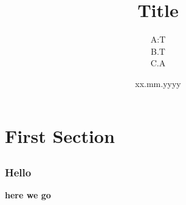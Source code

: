 \documentclass[compress]{beamer}
\title[sd]{Title}
\author[d]{A:T \inst{1}\\B.T \inst{2}\\  C.A \inst{1}}
\date[sd]{xx.mm.yyyy}
\institute[]{\inst{1}Something\\Somewhere\\ \inst{2} Something\\Somewhere}
\begin{document}
\begin{frame}
\titlepage
\end{frame}


\section{First Section}
\subsection{}
\begin{frame}
\frametitle{Hello}
\textbf{here we go}



\end{frame}
\end{document}
